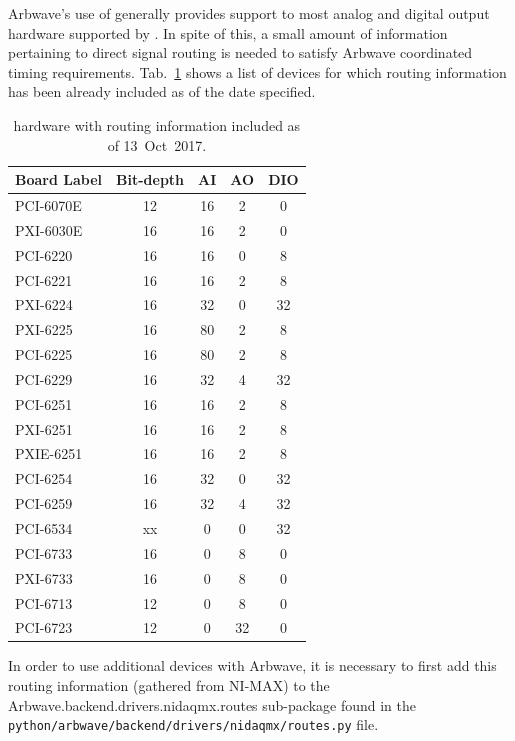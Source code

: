 Arbwave's use of  generally provides support to most
analog and digital output hardware supported by .  In spite of this,
a small amount of information pertaining to direct signal routing
is needed to satisfy Arbwave coordinated timing requirements.
Tab.~\ref{tab:daqmx} shows a list of  devices for which routing
information has been already included as of the date specified.

\begin{table}[ht!]
\centering
  \begin{tabular}{|l|cccc|}
    \hline
    Board Label & Bit-depth & AI & AO & DIO\footnotemark \\
    \hline
    \hline
    PCI-6070E & 12 & 16 & 2 & 0  \\
    PXI-6030E & 16 & 16 & 2 & 0  \\
    PCI-6220  & 16 & 16 & 0 & 8  \\
    PCI-6221  & 16 & 16 & 2 & 8  \\
    PXI-6224  & 16 & 32 & 0 & 32 \\
    PXI-6225  & 16 & 80 & 2 & 8  \\
    PCI-6225  & 16 & 80 & 2 & 8  \\
    PCI-6229  & 16 & 32 & 4 & 32 \\
    PCI-6251  & 16 & 16 & 2 & 8  \\
    PXI-6251  & 16 & 16 & 2 & 8  \\
    PXIE-6251 & 16 & 16 & 2 & 8  \\
    PCI-6254  & 16 & 32 & 0 & 32 \\
    PCI-6259  & 16 & 32 & 4 & 32 \\
    PCI-6534  & xx &  0 & 0 & 32 \\
    PCI-6733  & 16 &  0 & 8 & 0  \\
    PXI-6733  & 16 &  0 & 8 & 0  \\
    PCI-6713  & 12 &  0 & 8 & 0  \\
    PCI-6723  & 12 &  0 & 32& 0  \\
    \hline
  \end{tabular}
  \caption{
    \label{tab:daqmx}
     hardware with routing information included as of 13~Oct~2017.
  }
\end{table}

In order to use additional  devices with Arbwave, it is
necessary to first add this routing information (gathered from NI-MAX) to the
Arbwave.backend.drivers.nidaqmx.routes sub-package found in the\\
\noindent \texttt{python/arbwave/backend/drivers/nidaqmx/routes.py} file.


